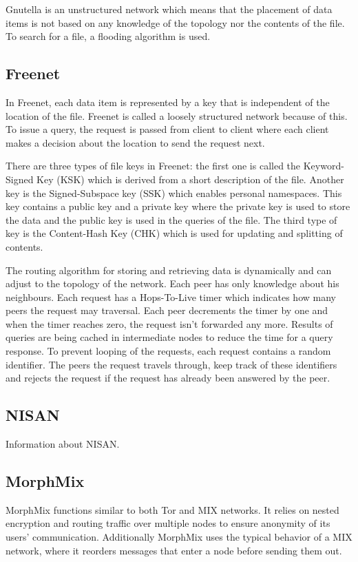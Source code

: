 \documentclass[journal]{IEEEtran}
\begin{document}
			Gnutella is an unstructured network which means that the placement of data items is not based on any knowledge of the topology nor the contents of the file. To search for a file, a flooding algorithm is used.
		
		\subsection{Freenet}
			In Freenet, each data item is represented by a key that is independent of the location of the file. Freenet is called a loosely structured network because of this. To issue a query, the request is passed from client to client where each client makes a decision about the location to send the request next.
		
			There are three types of file keys in Freenet: the first one is called the Keyword-Signed Key (KSK) which is derived from a short description of the file. Another key is the Signed-Subspace key (SSK) which enables personal namespaces. This key contains a public key and a private key where the private key is used to store the data and the public key is used in the queries of the file. The third type of key is the Content-Hash Key (CHK) which is used for updating and splitting of contents.
		
			The routing algorithm for storing and retrieving data is dynamically and can adjust to the topology of the network. Each peer has only knowledge about his neighbours. Each request has a Hops-To-Live timer which indicates how many peers the request may traversal. Each peer decrements the timer by one and when the timer reaches zero, the request isn't forwarded any more. Results of queries are being cached in intermediate nodes to reduce the time for a query response. To prevent looping of the requests, each request contains a random identifier. The peers the request travels through, keep track of these identifiers and rejects the request if the request has already been answered by the peer.
			
		\subsection{NISAN}
			Information about NISAN.
			
		\subsection{MorphMix}
			MorphMix \cite{rennhard2002introducing} functions similar to both Tor and MIX networks. It relies on nested encryption and routing traffic over multiple nodes to ensure anonymity of its users' communication. Additionally MorphMix uses the typical behavior of a MIX network, where it reorders messages that enter a node before sending them out.
			
\end{document}
